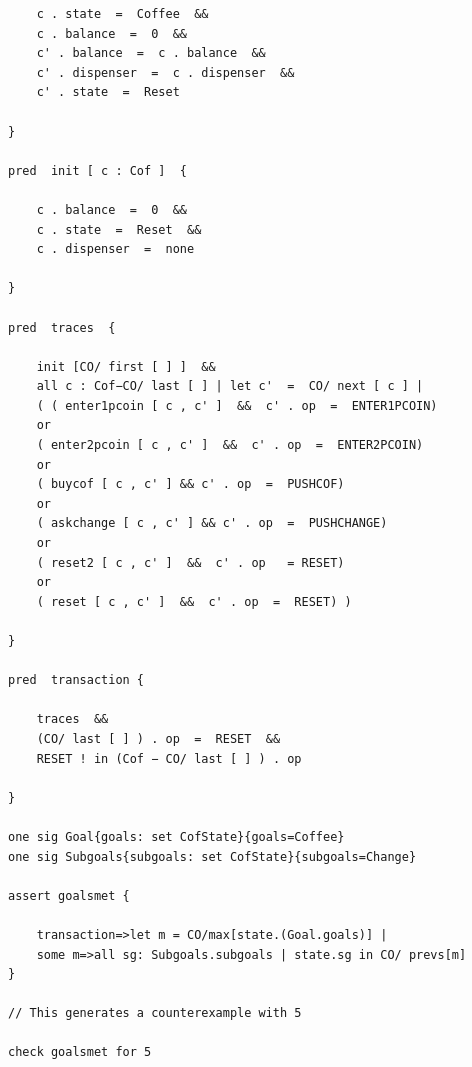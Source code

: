 \documentclass[a4paper,10pt]{report}
\begin{document}
\begin{verbatim}
	c . state  =  Coffee  &&
	c . balance  =  0  &&
	c' . balance  =  c . balance  &&
	c' . dispenser  =  c . dispenser  &&
	c' . state  =  Reset

}

pred  init [ c : Cof ]  {

	c . balance  =  0  &&
	c . state  =  Reset  &&
	c . dispenser  =  none

}

pred  traces  {

	init [CO/ first [ ] ]  &&
	all c : Cof−CO/ last [ ] | let c'  =  CO/ next [ c ] |
	( ( enter1pcoin [ c , c' ]  &&  c' . op  =  ENTER1PCOIN)
	or
	( enter2pcoin [ c , c' ]  &&  c' . op  =  ENTER2PCOIN)
	or
	( buycof [ c , c' ] && c' . op  =  PUSHCOF)
	or
	( askchange [ c , c' ] && c' . op  =  PUSHCHANGE)
	or
	( reset2 [ c , c' ]  &&  c' . op   = RESET)
	or
	( reset [ c , c' ]  &&  c' . op  =  RESET) )

}

pred  transaction {

	traces  &&
	(CO/ last [ ] ) . op  =  RESET  &&
	RESET ! in (Cof − CO/ last [ ] ) . op

}

one sig Goal{goals: set CofState}{goals=Coffee}
one sig Subgoals{subgoals: set CofState}{subgoals=Change}

assert goalsmet {

	transaction=>let m = CO/max[state.(Goal.goals)] |
	some m=>all sg: Subgoals.subgoals | state.sg in CO/ prevs[m]
}

// This generates a counterexample with 5

check goalsmet for 5
\end{verbatim}
\end{document}
